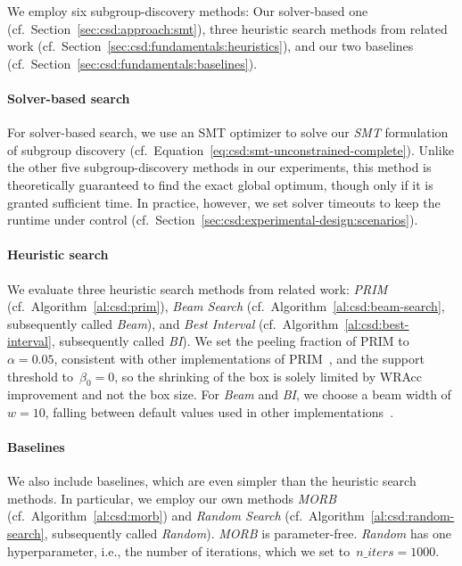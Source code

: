 \documentclass{article}
\theoremstyle{definition}
\begin{document}
We employ six subgroup-discovery methods:
Our solver-based one (cf.~Section~\ref{sec:csd:approach:smt}), three heuristic search methods from related work (cf.~Section~\ref{sec:csd:fundamentals:heuristics}), and our two baselines (cf.~Section~\ref{sec:csd:fundamentals:baselines}).

\paragraph{Solver-based search}

For solver-based search, we use an SMT optimizer to solve our \emph{SMT} formulation of subgroup discovery (cf.~Equation~\ref{eq:csd:smt-unconstrained-complete}).
Unlike the other five subgroup-discovery methods in our experiments, this method is theoretically guaranteed to find the exact global optimum, though only if it is granted sufficient time.
In practice, however, we set solver timeouts to keep the runtime under control (cf.~Section~\ref{sec:csd:experimental-design:scenarios}).

\paragraph{Heuristic search}

We evaluate three heuristic search methods from related work:
\emph{PRIM} (cf.~Algorithm~\ref{al:csd:prim}), \emph{Beam Search} (cf.~Algorithm~\ref{al:csd:beam-search}, subsequently called \emph{Beam}), and \emph{Best Interval} (cf.~Algorithm~\ref{al:csd:best-interval}, subsequently called \emph{BI}).
We set the peeling fraction of PRIM to~$\alpha = 0.05$, consistent with other implementations of PRIM~\cite{arzamasov2021reds, kwakkel2017the}, and the support threshold to~$\beta_0 = 0$, so the shrinking of the box is solely limited by WRAcc improvement and not the box size.
For \emph{Beam} and \emph{BI}, we choose a beam width of $w=10$, falling between default values used in other implementations~\cite{arzamasov2021reds, lemmerich2019pysubgroup}.

\paragraph{Baselines}

We also include baselines, which are even simpler than the heuristic search methods.
In particular, we employ our own methods \emph{MORB} (cf.~Algorithm~\ref{al:csd:morb}) and \emph{Random Search} (cf.~Algorithm~\ref{al:csd:random-search}, subsequently called \emph{Random}).
\emph{MORB} is parameter-free.
\emph{Random} has one hyperparameter, i.e., the number of iterations, which we set to~$n\_iters = 1000$.
\end{document}
